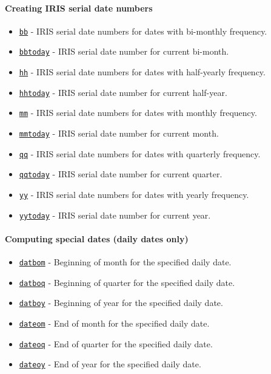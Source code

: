 

	\paragraph{Creating IRIS serial date
numbers}\label{creating-iris-serial-date-numbers}

\begin{itemize}
\itemsep1pt\parskip0pt
\item
  \href{dates/bb}{\texttt{bb}} - IRIS serial date numbers for dates with
  bi-monthly frequency.
\item
  \href{dates/bbtoday}{\texttt{bbtoday}} - IRIS serial date number for
  current bi-month.
\item
  \href{dates/hh}{\texttt{hh}} - IRIS serial date numbers for dates with
  half-yearly frequency.
\item
  \href{dates/hhtoday}{\texttt{hhtoday}} - IRIS serial date number for
  current half-year.
\item
  \href{dates/mm}{\texttt{mm}} - IRIS serial date numbers for dates with
  monthly frequency.
\item
  \href{dates/mmtoday}{\texttt{mmtoday}} - IRIS serial date number for
  current month.
\item
  \href{dates/qq}{\texttt{qq}} - IRIS serial date numbers for dates with
  quarterly frequency.
\item
  \href{dates/qqtoday}{\texttt{qqtoday}} - IRIS serial date number for
  current quarter.
\item
  \href{dates/yy}{\texttt{yy}} - IRIS serial date numbers for dates with
  yearly frequency.
\item
  \href{dates/yytoday}{\texttt{yytoday}} - IRIS serial date number for
  current year.
\end{itemize}

\paragraph{Computing special dates (daily dates
only)}\label{computing-special-dates-daily-dates-only}

\begin{itemize}
\itemsep1pt\parskip0pt
\item
  \href{dates/datbom}{\texttt{datbom}} - Beginning of month for the
  specified daily date.
\item
  \href{dates/datboq}{\texttt{datboq}} - Beginning of quarter for the
  specified daily date.
\item
  \href{dates/datboy}{\texttt{datboy}} - Beginning of year for the
  specified daily date.
\item
  \href{dates/dateom}{\texttt{dateom}} - End of month for the specified
  daily date.
\item
  \href{dates/dateoq}{\texttt{dateoq}} - End of quarter for the
  specified daily date.
\item
  \href{dates/dateoy}{\texttt{dateoy}} - End of year for the specified
  daily date.
\end{itemize}

